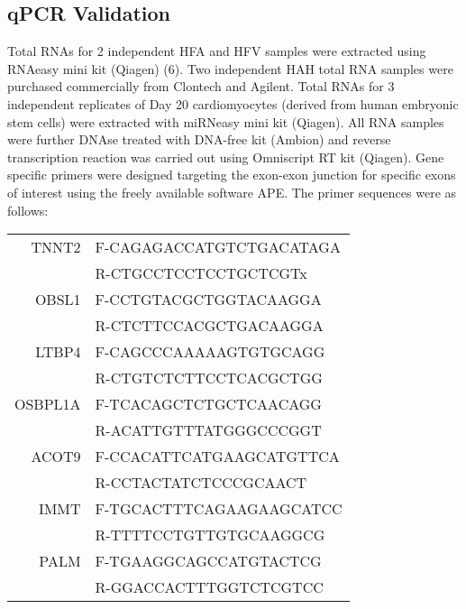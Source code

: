 \documentclass{article}
\begin{document}
\subsection{qPCR Validation}\label{cardioqpcr}

Total RNAs for 2 independent HFA and HFV samples were extracted using RNAeasy
mini kit (Qiagen) (6). Two independent HAH total RNA samples were purchased
commercially from Clontech and Agilent. Total RNAs for 3 independent replicates
of Day 20 cardiomyocytes (derived from human embryonic stem cells) were
extracted with miRNeasy mini kit (Qiagen). All RNA samples were further DNAse
treated with DNA-free kit (Ambion) and reverse transcription reaction was
carried out using Omniscript RT kit (Qiagen). Gene specific primers were
designed targeting the exon-exon junction for specific exons of interest using
the freely available software APE. The primer sequences were as follows:

\begin{center}
\begin{tabular}{rl}
TNNT2   & F-CAGAGACCATGTCTGACATAGA \\
        & R-CTGCCTCCTCCTGCTCGTx \\
OBSL1   & F-CCTGTACGCTGGTACAAGGA \\
        & R-CTCTTCCACGCTGACAAGGA \\
LTBP4   & F-CAGCCCAAAAAGTGTGCAGG \\
        & R-CTGTCTCTTCCTCACGCTGG \\
OSBPL1A & F-TCACAGCTCTGCTCAACAGG \\
        & R-ACATTGTTTATGGGCCCGGT \\
ACOT9   & F-CCACATTCATGAAGCATGTTCA \\
        & R-CCTACTATCTCCCGCAACT \\
IMMT    & F-TGCACTTTCAGAAGAAGCATCC \\
        & R-TTTTCCTGTTGTGCAAGGCG \\
PALM    & F-TGAAGGCAGCCATGTACTCG \\
        & R-GGACCACTTTGGTCTCGTCC
\end{tabular}
\end{center}
\end{document}

